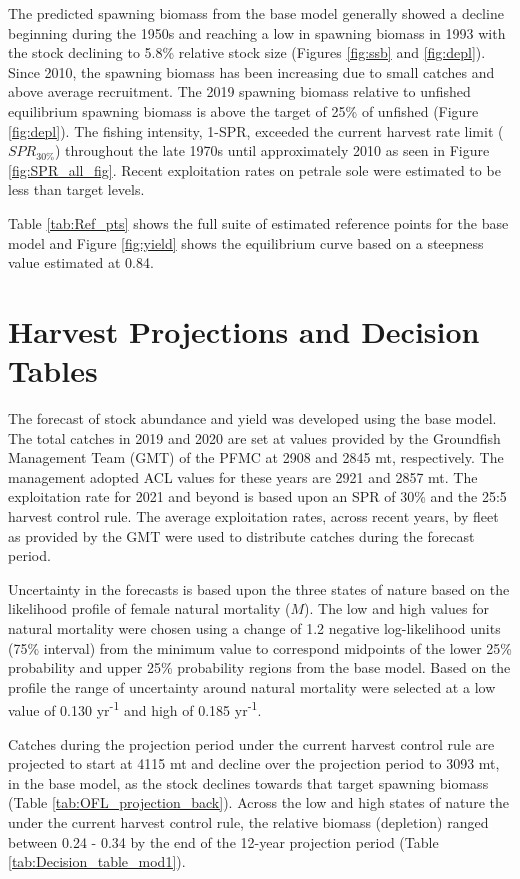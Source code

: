 \documentclass[12pt,]{article}
\begin{document}
The predicted spawning biomass from the base model generally showed a
decline beginning during the 1950s and reaching a low in spawning
biomass in 1993 with the stock declining to 5.8\% relative stock size
(Figures \ref{fig:ssb} and \ref{fig:depl}). Since 2010, the spawning
biomass has been increasing due to small catches and above average
recruitment. The 2019 spawning biomass relative to unfished equilibrium
spawning biomass is above the target of 25\% of unfished (Figure
\ref{fig:depl}). The fishing intensity, 1-SPR, exceeded the current
harvest rate limit (\(SPR_{30\%}\)) throughout the late 1970s until
approximately 2010 as seen in Figure \ref{fig:SPR_all_fig}. Recent
exploitation rates on petrale sole were estimated to be less than target
levels.

Table \ref{tab:Ref_pts} shows the full suite of estimated reference
points for the base model and Figure \ref{fig:yield} shows the
equilibrium curve based on a steepness value estimated at 0.84.

\section{Harvest Projections and Decision
Tables}\label{harvest-projections-and-decision-tables}

The forecast of stock abundance and yield was developed using the base
model. The total catches in 2019 and 2020 are set at values provided by
the Groundfish Management Team (GMT) of the PFMC at 2908 and 2845 mt,
respectively. The management adopted ACL values for these years are 2921
and 2857 mt. The exploitation rate for 2021 and beyond is based upon an
SPR of 30\% and the 25:5 harvest control rule. The average exploitation
rates, across recent years, by fleet as provided by the GMT were used to
distribute catches during the forecast period.

Uncertainty in the forecasts is based upon the three states of nature
based on the likelihood profile of female natural mortality (\(M\)). The
low and high values for natural mortality were chosen using a change of
1.2 negative log-likelihood units (75\% interval) from the minimum value
to correspond midpoints of the lower 25\% probability and upper 25\%
probability regions from the base model. Based on the profile the range
of uncertainty around natural mortality were selected at a low value of
0.130 yr\textsuperscript{-1} and high of 0.185 yr\textsuperscript{-1}.

Catches during the projection period under the current harvest control
rule are projected to start at 4115 mt and decline over the projection
period to 3093 mt, in the base model, as the stock declines towards that
target spawning biomass (Table \ref{tab:OFL_projection_back}). Across
the low and high states of nature the under the current harvest control
rule, the relative biomass (depletion) ranged between 0.24 - 0.34 by the
end of the 12-year projection period (Table
\ref{tab:Decision_table_mod1}).
\end{document}
